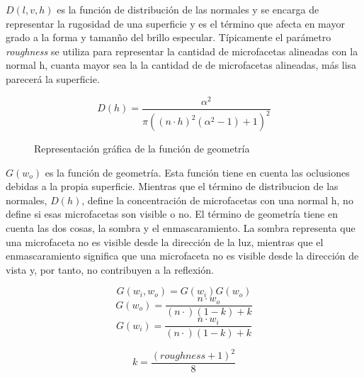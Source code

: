             $D(l, v, h)$  es la funci\'on de distribuci\'on de las normales y se encarga de representar la rugosidad de una superficie
            y es el t\'ermino que afecta en mayor grado a la forma y taman\~no del brillo especular. T\'ipicamente el par\'ametro
            \textit{roughness} se utiliza para representar la cantidad de microfacetas alineadas con la normal h, cuanta mayor sea la
            la cantidad de de microfacetas alineadas, m\'as lisa parecer\'a la superficie.
    
            \singlespacing
            \begin{equation}
            D(h) = \frac{\alpha^2}{\pi((n\cdot{h})^2(\alpha^2 - 1) + 1)^2}
            \end{equation}
            \singlespacing
            
    
            \begin{figure}[H]
                \vspace{0.5cm}
                \centering
                \caption{Representaci\'on gr\'afica de la funci\'on de geometr\'ia}
            \end{figure}
    
            $G(w_o)$ es la funci\'on de geometr\'ia. Esta funci\'on tiene en cuenta las oclusiones debidas a la propia superficie.
            Mientras que el t\'ermino de distribucion de las normales, $D(h)$, define la concentraci\'on de microfacetas con una normal h,
            no define si esas microfacetas son visible o no. El t\'ermino de geometr\'ia tiene en cuenta las dos cosas, la sombra
            y el enmascaramiento. La sombra representa que una microfaceta no es visible desde la direcci\'on de la luz, mientras que el
            enmascaramiento significa que una microfaceta no es visible desde la direcci\'on de vista y, por tanto, no contribuyen
            a la reflexi\'on.
    
            $$
            G(w_i, w_o) = G(w_i)G(w_o)
            $$
            \singlespacing
            $$
            G(w_o) = \frac{n\cdot{w_o}}{(n\cdot) (1 - k) + k}
            $$
            \singlespacing
            $$
            G(w_i) = \frac{n\cdot{w_i}}{(n\cdot) (1 - k) + k}
            $$
            \singlespacing
    
            \begin{equation}
            k = \frac{(roughness + 1)^2}{8}
            \end{equation}
    
